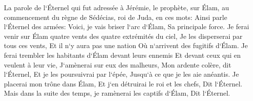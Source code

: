 \verse La parole de l`Éternel qui fut adressée à Jérémie, le prophète, sur Élam, au commencement du règne de Sédécias, roi de Juda, en ces mots: 
\verse Ainsi parle l`Éternel des armées: Voici, je vais briser l`arc d`Élam, Sa principale force. 
\verse Je ferai venir sur Élam quatre vents des quatre extrémités du ciel, Je les disperserai par tous ces vents, Et il n`y aura pas une nation Où n`arrivent des fugitifs d`Élam. 
\verse Je ferai trembler les habitants d`Élam devant leurs ennemis Et devant ceux qui en veulent à leur vie, J`amènerai sur eux des malheurs, Mon ardente colère, dit l`Éternel, Et je les poursuivrai par l`épée, Jusqu`à ce que je les aie anéantis. 
\verse Je placerai mon trône dans Élam, Et j`en détruirai le roi et les chefs, Dit l`Éternel. 
\verse Mais dans la suite des temps, je ramènerai les captifs d`Élam, Dit l`Éternel. 

